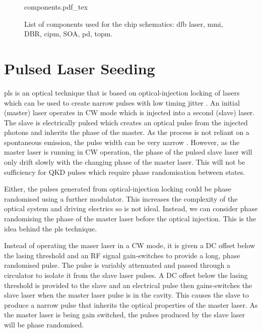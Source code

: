 
\begin{figure}[t]
	\centering
	\huge	
	\def\svgwidth{0.9\textwidth} 
	{components.pdf_tex}
	\caption[Components used for chip schematics]{List of components used for the chip schematics: \acf{dfb} laser, \acf{mmi}, \acf{DBR}, \acf{cipm}, \acf{SOA}, \acf{pd}, \acf{topm}.}
	\label{fig:components}
\end{figure}

\section{Pulsed Laser Seeding}

\Ac{pls} is an optical technique that is based on optical-injection locking of lasers which can be used to create narrow pulses with low timing jitter \cite{Seo1996, Gunning1996}. An initial (master) laser operates in \ac{CW} mode which is injected into a second (slave) laser. The slave is electrically pulsed which creates an optical pulse from the injected photons and inherits the phase of the master. As the process is not reliant on a spontaneous emission, the pulse width can be very narrow \cite{}. However, as the master laser is running in \ac{CW} operation, the phase of the pulsed slave laser will only drift slowly with the changing phase of the master laser. This will not be sufficiency for \ac{QKD} pulses which require phase randomisation between states. 


Either, the pulses generated from optical-injection locking could be phase randomised using a further modulator. This increases the complexity of the optical system and driving electrics so is not ideal. Instead, we can consider phase randomising the phase of the master laser before the optical injection. This is the idea behind the \ac{pls} technique.

Instead of operating the maser laser in a \ac{CW} mode, it is given a DC offset below the lasing threshold and an RF signal gain-switches to provide a long, phase randomised pulse. The pulse is variably attenuated and passed through a circulator to isolate it from the slave laser pulses. A DC offset below the lasing threshold is provided to the slave and an electrical pulse then gains-switches the slave laser when the master laser pulse is in the cavity. This causes the slave to produce a narrow pulse that inherits the optical properties of the master laser. As the master laser is being gain switched, the pulses produced by the slave laser will be phase randomised.

